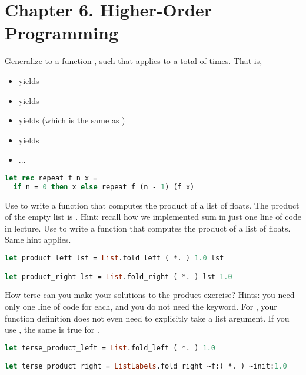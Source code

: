 \section*{Chapter 6. Higher-Order Programming}

\problem[repeat]
Generalize  to a function , such that  applies  to  a total of  times. That is,
\begin{itemize}
  \item {} yields 
  \item {} yields 
  \item {} yields  (which is the same as )
  \item {} yields 
  \item ...
\end{itemize}

\begin{lstlisting}[language=OCaml]
let rec repeat f n x =
  if n = 0 then x else repeat f (n - 1) (f x)
\end{lstlisting}

\problem[product]
Use  to write a function  that computes the product of a list of floats. The product of the empty list is . Hint: recall how we implemented sum in just one line of code in lecture.
Use  to write a function  that computes the product of a list of floats. Same hint applies.

\begin{lstlisting}[language=OCaml]
let product_left lst = List.fold_left ( *. ) 1.0 lst

let product_right lst = List.fold_right ( *. ) lst 1.0
\end{lstlisting}

How terse can you make your solutions to the product exercise? Hints: you need only one line of code for each, and you do not need the  keyword. For , your function definition does not even need to explicitly take a list argument. If you use , the same is true for .

\begin{lstlisting}[language=OCaml]
let terse_product_left = List.fold_left ( *. ) 1.0

let terse_product_right = ListLabels.fold_right ~f:( *. ) ~init:1.0
\end{lstlisting}

